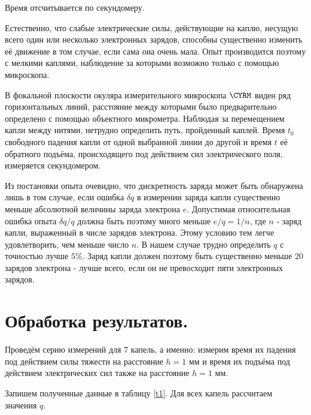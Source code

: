 \documentclass[a4paper, 12pt, twoside]{article}
\begin{document}
Время отсчитывается по секундомеру.

Естественно, что слабые электрические силы, действующие на каплю, несущую всего один или несколько электронных зарядов, способны существенно изменить её движение в том случае, если сама она очень мала. Опыт производится поэтому с мелкими каплями, наблюдение за которыми возможно только с помощью микроскопа.

В фокальной плоскости окуляра измерительного микроскопа $\CYRM$ виден ряд горизонтальных линий, расстояние между которыми было предварительно определено с помощью объектного микрометра. Наблюдая за перемещением капли между нитями, нетрудно определить путь, пройденный каплей. Время $t_0$ свободного падения капли от одной выбранной линии до другой и время $t$ её обратного подъёма, происходящего под действием сил электрического поля, измеряется секундомером.

Из постановки опыта очевидно, что дискретность заряда может быть обнаружена лишь в том случае, если ошибка $\delta q$ в измерении заряда капли существенно меньше абсолютной величины заряда электрона $e$. Допустимая относительная ошибка опыта $\delta q/q$ должна быть поэтому много меньше $e/q = 1/n$, где $n$ - заряд капли, выраженный в числе зарядов электрона. Этому условию тем легче удовлетворить, чем меньше число $n$. В нашем случае трудно определить $q$ с точностью лучше $5\%$. Заряд капли должен поэтому быть существенно меньше 20 зарядов электрона - лучше всего, если он не превосходит пяти электронных зарядов.
\newpage
\section{Обработка результатов.}

Проведём серию измерений для 7 капель, а именно: измерим время их падения под действием силы тяжести на расстояние $h = 1$ мм и время их подъёма под действием электрических сил также на расстояние $h = 1$ мм.

Запишем полученные данные в таблицу \ref{t1}. Для всех капель рассчитаем значения $q$.
\end{document}
